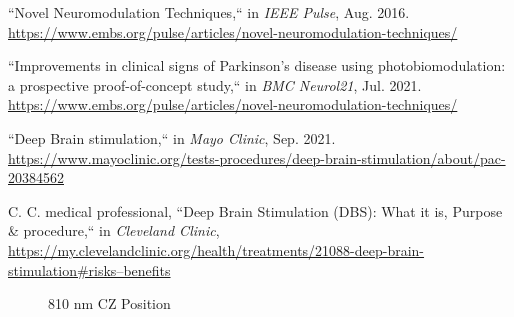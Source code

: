 \documentclass[journal,twoside,web]{ieeecolor}
\begin{document}
\begin{thebibliography}{00}

 ``Novel Neuromodulation Techniques,`` in \emph{IEEE Pulse}, Aug. 2016. 
\underline{https://www.embs.org/pulse/articles/novel-neuromodulation-techniques/} 

 ``Improvements in clinical signs of Parkinson's disease using photobiomodulation: a prospective proof-of-concept study,`` in \emph{BMC Neurol21}, Jul. 2021. 
\underline{https://www.embs.org/pulse/articles/novel-neuromodulation-techniques/} 

 ``Deep Brain stimulation,`` in \emph{Mayo Clinic}, Sep. 2021. 
\underline{https://www.mayoclinic.org/tests-procedures/deep-brain-stimulation/about/pac-20384562}

 C. C. medical professional, ``Deep Brain Stimulation (DBS): What it is, Purpose \& procedure,`` in \emph{Cleveland Clinic}, 
\underline{https://my.clevelandclinic.org/health/treatments/21088-deep-brain-stimulation\#risks--benefits}

\end{thebibliography}

\begin{figure}[!htb]
    \caption{\label{fig:810-CZ} 810 nm CZ Position}
\end{figure}
\end{document}

